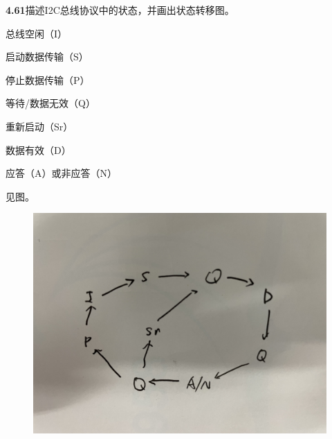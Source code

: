 \documentclass{article}
\begin{document}
    \noindent\textbf{4.61}描述I2C总线协议中的状态，并画出状态转移图。\par
    \quad{}总线空闲（I）\par
    \quad{}启动数据传输（S）\par
    \quad{}停止数据传输（P）\par
    \quad{}等待/数据无效（Q）\par
    \quad{}重新启动（Sr）\par
    \quad{}数据有效（D）\par
    \quad{}应答（A）或非应答（N）\par
    见图。
    \begin{figure}[h]
        \centering
        \includegraphics[scale=0.05]{IMG_0910.jpg}
    \end{figure}
    \\[4pt]\par
\end{document}
